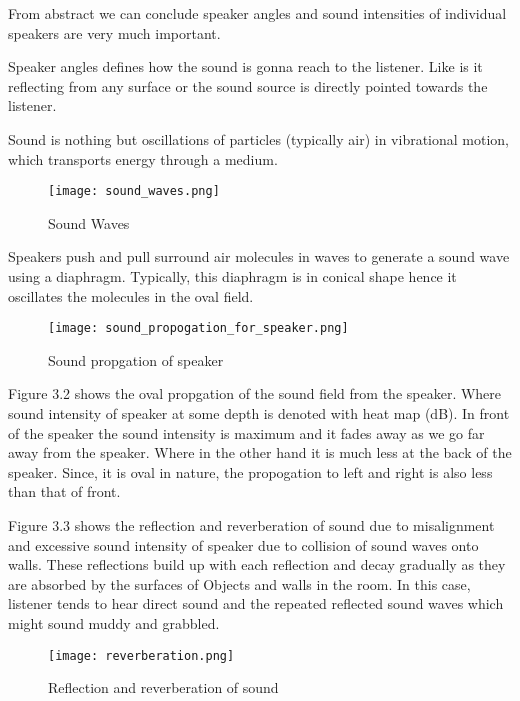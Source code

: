 \documentclass[../../../patent_v1.tex]{subfiles}
\begin{document}
From abstract we can conclude speaker angles and sound intensities of individual 
speakers are very much important.

Speaker angles defines how the sound is gonna reach to the listener. Like is it 
reflecting from any surface or the sound source is directly pointed towards the listener.

Sound is nothing but oscillations of particles (typically air) in vibrational motion, which
transports energy through a medium.

\begin{figure}
    \texttt{[image: sound\_waves.png]}
    \caption{Sound Waves}
\end{figure}

\FloatBarrier

Speakers push and pull surround air molecules in waves to generate a sound wave using a diaphragm.
Typically, this diaphragm is in conical shape hence it oscillates the molecules in the oval field. 

\begin{figure*}[ht]
    \texttt{[image: sound\_propogation\_for\_speaker.png]}
    \caption{Sound propgation of speaker}
\end{figure*}

\FloatBarrier

Figure 3.2 shows the oval propgation of the sound field from the speaker. Where sound
intensity of speaker at some depth is denoted with heat map (dB). In front of the speaker
the sound intensity is maximum and it fades away as we go far away from the speaker. Where 
in the other hand it is much less at the back of the speaker. Since, it is oval in nature, 
the propogation to left and right is also less than that of front.

Figure 3.3 shows the reflection and reverberation of sound due to misalignment
and excessive sound intensity of speaker due to collision of sound waves onto walls. 
These reflections build up with each reflection and decay gradually as they are absorbed by the surfaces of Objects and walls
in the room. In this case, listener tends to hear direct sound and the repeated
reflected sound waves which might sound muddy and grabbled.

\begin{figure}
    \texttt{[image: reverberation.png]}
    \caption{Reflection and reverberation of sound}
\end{figure}

\FloatBarrier
\end{document}
